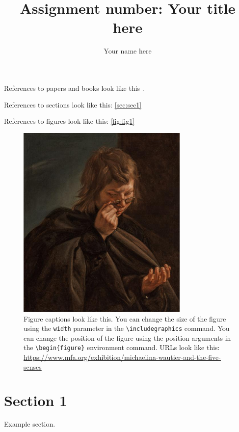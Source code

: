 \documentclass{article}
\title{Assignment number: Your title here}
\author{Your name here}
\begin{document}
  \maketitle %
  \thispagestyle{empty}

References to papers and books look like this \cite{munzner2014visualization}. 

References to sections look like this: \autoref{sec:sec1}

References to figures look like this: \autoref{fig:fig1}

\begin{figure}[ht] %
    \centering
    \includegraphics[width=0.75\textwidth]{figs/sight.jpg}
    \caption{
        Figure captions look like this. You can change the size of the figure using the \texttt{width} parameter in the \texttt{\textbackslash includegraphics} command. You can change the position of the figure using the position arguments in the \texttt{\textbackslash begin\{figure\}} environment command.
        URLs look like this: \url{https://www.mfa.org/exhibition/michaelina-wautier-and-the-five-senses}
    }
    \label{fig:fig1}
\end{figure}

\section{Section 1}
\label{sec:sec1}
Example section.

\begin{refcontext}[sorting=nyt]
\printbibliography
\end{refcontext}
\end{document}

